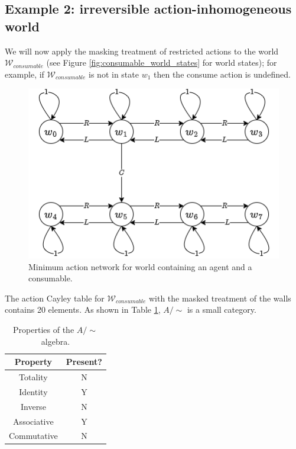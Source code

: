 \subsection{Example 2: irreversible action-inhomogeneous world}\label{sec:masked irreversible action-inhomogeneous world}

We will now apply the masking treatment of restricted actions to the world $\mathscr{W}_{consumable}$ (see Figure \ref{fig:consumable_world_states} for world states); for example, if $\mathscr{W}_{consumable}$ is not in state $w_{1}$ then the consume action is undefined.

\begin{figure}[H]
    \centering
    \includegraphics[scale=0.5]{5BeyondSBDRL/Old/Images/fig-min-action-net-world-with-consumable-masked.png}
    \caption{Minimum action network for world containing an agent and a consumable.}
    \label{fig-min-action-net-world-with-consumable-masked}
\end{figure}

The action Cayley table for $\mathscr{W}_{consumable}$ with the masked treatment of the walls contains 20 elements.
As shown in Table \ref{tab:masked-consumable-properties}, $A/\sim$ is a small category.

\begin{table}[H]
    \centering
    \begin{tabular}{c|c}
        \textbf{Property}   & \textbf{Present?} \\
        \hline
        Totality            & N\\
        Identity            & Y\\
        Inverse             & N\\
        Associative         & Y\\
        Commutative         & N
    \end{tabular}
    \caption{Properties of the $A/\sim$ algebra.}
    \label{tab:masked-consumable-properties}
\end{table}

